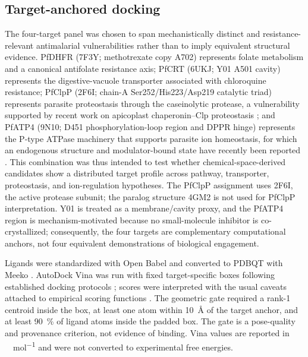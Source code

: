 \documentclass[journal=jcisd8,manuscript=article]{achemso}
\begin{document}
\subsection{Target-anchored docking}
The four-target panel was chosen to span mechanistically distinct and resistance-relevant antimalarial vulnerabilities rather than to imply equivalent structural evidence. PfDHFR (7F3Y; methotrexate copy A702) represents folate metabolism and a canonical antifolate resistance axis; PfCRT (6UKJ; Y01 A501 cavity) represents the digestive-vacuole transporter associated with chloroquine resistance; PfClpP (2F6I; chain-A Ser252/His223/Asp219 catalytic triad) represents parasite proteostasis through the caseinolytic protease, a vulnerability supported by recent work on apicoplast chaperonin--Clp proteostasis \cite{Tissawak2025}; and PfATP4 (9N10; D451 phosphorylation-loop region and DPPR hinge) represents the P-type ATPase machinery that supports parasite ion homeostasis, for which an endogenous structure and modulator-bound state have recently been reported \cite{Haile2025}. This combination was thus intended to test whether chemical-space-derived candidates show a distributed target profile across pathway, transporter, proteostasis, and ion-regulation hypotheses. The PfClpP assignment uses 2F6I, the active protease subunit; the paralog structure 4GM2 is not used for PfClpP interpretation. Y01 is treated as a membrane/cavity proxy, and the PfATP4 region is mechanism-motivated because no small-molecule inhibitor is co-crystallized; consequently, the four targets are complementary computational anchors, not four equivalent demonstrations of biological engagement.

Ligands were standardized with Open Babel \cite{OBoyle2011} and converted to PDBQT with Meeko \cite{Eberhardt2021}. AutoDock Vina was run with fixed target-specific boxes following established docking protocols \cite{Trott2009}; scores were interpreted with the usual caveats attached to empirical scoring functions \cite{Quiroga2016}. The geometric gate required a rank-1 centroid inside the box, at least one atom within \qty{10}{\angstrom} of the target anchor, and at least \qty{90}{\percent} of ligand atoms inside the padded box. The gate is a pose-quality and provenance criterion, not evidence of binding. Vina values are reported in \si{\kilo\calorie\per\mole} and were not converted to experimental free energies.
\end{document}
